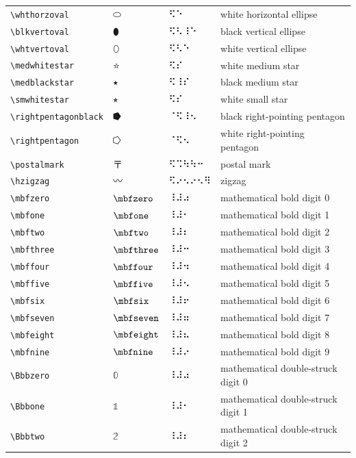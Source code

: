 \documentclass[oneside]{article}
\begin{document}
\begin{longtable}{llll}
\verb|\whthorzoval| & $\whthorzoval$ &  ⠫⠑  & {white horizontal ellipse} \\[2ex]
\verb|\blkvertoval| & $\blkvertoval$ &  ⠫⠣⠸⠑  & {black vertical ellipse} \\[2ex]
\verb|\whtvertoval| & $\whtvertoval$ &  ⠫⠣⠑  & {white vertical ellipse} \\[2ex]
\verb|\medwhitestar| & $\medwhitestar$ &  ⠫⠎  & {white medium star} \\[2ex]
\verb|\medblackstar| & $\medblackstar$ &  ⠫⠸⠎  & {black medium star} \\[2ex]
\verb|\smwhitestar| & $\smwhitestar$ &  ⠫⠎  & {white small star} \\[2ex]
\verb|\rightpentagonblack| & $\rightpentagonblack$ &  ⠈⠫⠸⠢  & {black right-pointing pentagon} \\[2ex]
\verb|\rightpentagon| & $\rightpentagon$ &  ⠈⠫⠢  & {white right-pointing pentagon} \\[2ex]
\verb|\postalmark| & $\postalmark$ &   ⠫⠩⠳⠳⠒   & {postal mark} \\[2ex]
\verb|\hzigzag| & $\hzigzag$ &  ⠫⠔⠢⠔⠢⠻  & {zigzag} \\[2ex]
\verb|\mbfzero| & $\mbfzero$ &  ⠸⠼⠴  & {mathematical bold digit 0} \\[2ex]
\verb|\mbfone| & $\mbfone$ &  ⠸⠼⠂  & {mathematical bold digit 1} \\[2ex]
\verb|\mbftwo| & $\mbftwo$ &  ⠸⠼⠆  & {mathematical bold digit 2} \\[2ex]
\verb|\mbfthree| & $\mbfthree$ &  ⠸⠼⠒  & {mathematical bold digit 3} \\[2ex]
\verb|\mbffour| & $\mbffour$ &  ⠸⠼⠲  & {mathematical bold digit 4} \\[2ex]
\verb|\mbffive| & $\mbffive$ &  ⠸⠼⠢  & {mathematical bold digit 5} \\[2ex]
\verb|\mbfsix| & $\mbfsix$ &  ⠸⠼⠖  & {mathematical bold digit 6} \\[2ex]
\verb|\mbfseven| & $\mbfseven$ &  ⠸⠼⠶  & {mathematical bold digit 7} \\[2ex]
\verb|\mbfeight| & $\mbfeight$ &  ⠸⠼⠦  & {mathematical bold digit 8} \\[2ex]
\verb|\mbfnine| & $\mbfnine$ &  ⠸⠼⠔  & {mathematical bold digit 9} \\[2ex]
\verb|\Bbbzero| & $\Bbbzero$ &  ⠸⠼⠴  & {mathematical double-struck digit 0} \\[2ex]
\verb|\Bbbone| & $\Bbbone$ &  ⠸⠼⠂  & {mathematical double-struck digit 1} \\[2ex]
\verb|\Bbbtwo| & $\Bbbtwo$ &  ⠸⠼⠆  & {mathematical double-struck digit 2} \\[2ex]

\end{longtable}
\end{document}
